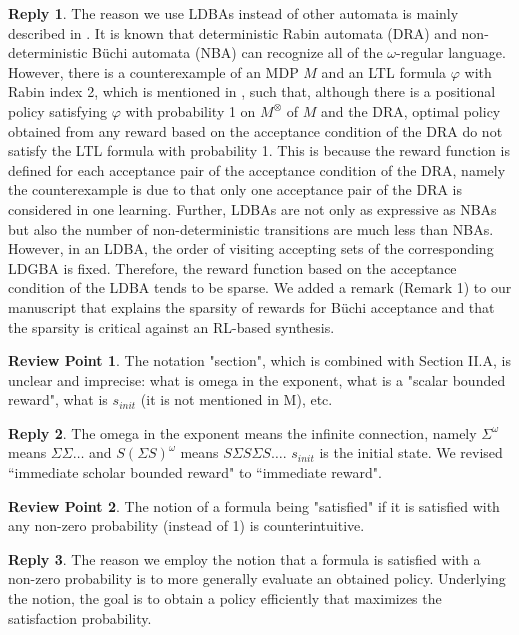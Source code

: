 \documentclass[10 pt, dvipdfmx]{article}
\theoremstyle{definition}
\newtheorem{review point}{Review Point}[section]
\newtheorem*{reply}{Reply}
\begin{document}
\begin{reply}
  The reason we use LDBAs instead of other automata is mainly described in \cite{Hahn2019}. It is known that deterministic Rabin automata (DRA) and non-deterministic B\"{u}chi automata (NBA) can recognize all of the $\omega$-regular language. However, there is a counterexample of an MDP $M$ and an LTL formula $\varphi$ with Rabin index 2, which is mentioned in \cite{Hahn2019}, such that, although there is a positional policy satisfying $\varphi$ with probability 1 on $M^{\otimes}$ of $M$ and the DRA, optimal policy obtained from any reward based on the acceptance condition of the DRA do not satisfy the LTL formula with probability 1. This is because the reward function is defined for each acceptance pair of the acceptance condition of the DRA, namely the counterexample is due to that only one acceptance pair of the DRA is considered in one learning. Further, LDBAs are not only as expressive as NBAs but also the number of non-deterministic transitions are much less than NBAs.
  However, in an LDBA, the order of visiting accepting sets of the corresponding LDGBA is fixed. Therefore, the reward function based on the acceptance condition of the LDBA tends to be sparse. We added a remark (Remark 1) to our manuscript that explains the sparsity of rewards for B\"{u}chi acceptance and that the sparsity is critical against an RL-based synthesis.
\end{reply}

\begin{review point}
  The notation "section", which is combined with Section II.A, is
unclear and imprecise: what is omega in the exponent, what is a "scalar
bounded reward", what is $s_{init}$ (it is not mentioned in M), etc.
\end{review point}

\begin{reply}
  The omega in the exponent means the infinite connection, namely $\Sigma^{\omega}$ means $\Sigma \Sigma \ldots$ and $S (\Sigma S)^{\omega}$ means $S \Sigma S \Sigma S \ldots$. $s_{init}$ is the initial state. We revised ``immediate scholar bounded reward" to ``immediate reward".
\end{reply}

\begin{review point}
  The notion of a formula being "satisfied" if it is satisfied with any
non-zero probability (instead of 1) is counterintuitive.
\end{review point}

\begin{reply}
  The reason we employ the notion that a formula is satisfied with a non-zero probability is to more generally evaluate an obtained policy. Underlying the notion, the goal is to obtain a policy efficiently that maximizes the satisfaction probability.
\end{reply}
\end{document}
